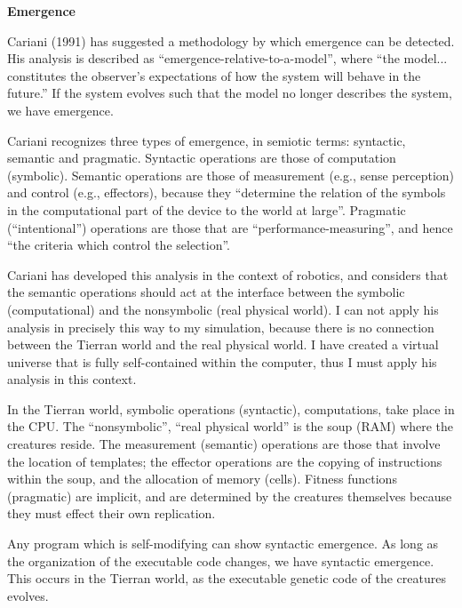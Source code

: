 \LP
\bf Emergence\rm
\eLP

Cariani (1991) has suggested a methodology by which emergence can be
detected.  His analysis is described as ``emergence-relative-to-a-model'',
where ``the model... constitutes the observer's expectations of how the
system will behave in the future.''  If the system evolves such that the
model no longer describes the system, we have emergence.

Cariani recognizes three types of emergence, in semiotic terms: syntactic,
semantic and pragmatic.  Syntactic operations are those of computation
(symbolic).  Semantic operations are those of measurement (e.g., sense
perception) and control (e.g., effectors), because they ``determine the
relation of the symbols in the computational part of the device to the
world at large''.  Pragmatic (``intentional'') operations are those that
are ``performance-measuring'', and hence ``the criteria which control the
selection''.

Cariani has developed this analysis in the context of robotics, and considers
that the semantic operations should act at the interface between the symbolic
(computational) and the nonsymbolic (real physical world).  I can not apply
his analysis in precisely this way to my simulation, because there is no
connection between the Tierran world and the real physical world.
I have created a virtual universe that is fully self-contained within the
computer, thus I must apply his analysis in this context.

In the Tierran world, symbolic operations (syntactic), computations, take
place in the CPU.  The ``nonsymbolic'', ``real physical world'' is the
soup (RAM) where the creatures reside.  The measurement (semantic) operations
are those that involve the location of templates; the effector operations are
the copying of instructions within the soup, and the allocation of memory
(cells).  Fitness functions (pragmatic) are implicit, and are determined
by the creatures themselves because they must effect their own replication.

Any program which is self-modifying can show syntactic emergence.  As long
as the organization of the executable code changes, we have syntactic
emergence.  This occurs in the Tierran world, as the executable genetic
code of the creatures evolves.

